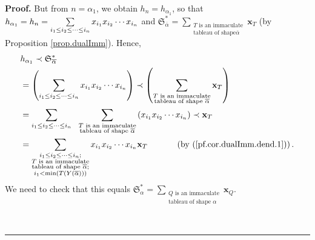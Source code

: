 \documentclass[numbers=enddot,12pt,final,onecolumn,notitlepage,abstracton]{scrartcl}%
\theoremstyle{definition}
\newenvironment{proof}[1][Proof]{\noindent\textbf{#1.} }{\ \rule{0.5em}{0.5em}}
\newenvironment{vershort}{}{}
\let\sumnonlimits\sum
\renewcommand{\sum}{\sumnonlimits\limits}
\begin{document}
\begin{proof}
\begin{vershort}
But from $n=\alpha_{1}$, we obtain $h_{n}=h_{\alpha_{1}}$, so that
$h_{\alpha_{1}}=h_{n}=\sum\limits_{i_{1}\leq i_{2}\leq\cdots\leq i_{n}%
}x_{i_{1}}x_{i_{2}}\cdots x_{i_{n}}$ and $\mathfrak{S}_{\overline{\alpha}%
}^{\ast}=\sum_{\substack{T\text{ is an immaculate}\\\text{tableau of shape
}\overline{\alpha}}}\mathbf{x}_{T}$ (by Proposition \ref{prop.dualImm}).
Hence,%
\begin{align}
&  h_{\alpha_{1}}\left.  \prec\right.  \mathfrak{S}_{\overline{\alpha}}^{\ast
}\nonumber\\
&  =\left(  \sum\limits_{i_{1}\leq i_{2}\leq\cdots\leq i_{n}}x_{i_{1}}%
x_{i_{2}}\cdots x_{i_{n}}\right)  \left.  \prec\right.  \left(  \sum
_{\substack{T\text{ is an immaculate}\\\text{tableau of shape }\overline
{\alpha}}}\mathbf{x}_{T}\right)  \nonumber\\
&  =\sum\limits_{i_{1}\leq i_{2}\leq\cdots\leq i_{n}}\ \ \sum
_{\substack{T\text{ is an immaculate}\\\text{tableau of shape }\overline
{\alpha}}}\left(  x_{i_{1}}x_{i_{2}}\cdots x_{i_{n}}\right)  \left.
\prec\right.  \mathbf{x}_{T}\nonumber\\
&  =\sum\limits_{\substack{i_{1}\leq i_{2}\leq\cdots\leq i_{n};\\T\text{ is an
immaculate}\\\text{tableau of shape }\overline{\alpha};\\i_{1}<\min\left(
T\left(  Y\left(  \overline{\alpha}\right)  \right)  \right)  }}x_{i_{1}%
}x_{i_{2}}\cdots x_{i_{n}}\mathbf{x}_{T}\ \ \ \ \ \ \ \ \ \ \left(  \text{by
(\ref{pf.cor.dualImm.dend.1})}\right)  .\label{pf.cor.dualImm.dend.short.RHS}%
\end{align}
We need to check that this equals $\mathfrak{S}_{\alpha}^{\ast}=\sum
_{\substack{Q\text{ is an immaculate}\\\text{tableau of shape }\alpha
}}\mathbf{x}_{Q}$.
\end{vershort}


\end{proof}
\end{document}

